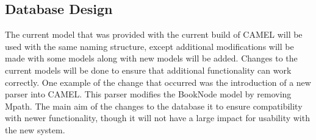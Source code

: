 \subsection{Database Design}
	The current model that was provided with the current build of CAMEL will be used with the same naming structure, except additional modifications will be made with some models along with new models will be added. Changes to the current models will be done to ensure that additional functionality can work correctly. One example of the change that occurred was the introduction of a new parser into CAMEL. This parser modifies the BookNode model by removing Mpath. The main aim of the changes to the database it to ensure compatibility with newer functionality, though it will not have a large impact for usability with the new system.\\
	

